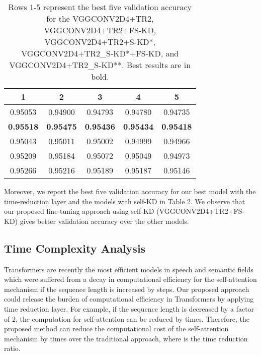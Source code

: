 \documentclass{article}
\begin{document}
\begin{table}[ht]
\caption{Rows 1-5 represent the best five validation accuracy for the VGGCONV2D4+TR2, VGGCONV2D4+TR2+FS-KD, VGGCONV2D4+TR2+S-KD*, VGGCONV2D4+TR2_S-KD*+FS-KD, and VGGCONV2D4+TR2_S-KD**. Best results are in bold.}
\label{val5}
\vskip 0.1in
\begin{center}
\begin{small}
\begin{sc}
\begin{tabular}{ccccc}
\toprule
    1&2&3&4&5 \\
\midrule
    0.95053& 0.94900& 0.94793& 0.94780& 0.94735 \\ 
    \textbf{0.95518}& \textbf{0.95475}& \textbf{0.95436}& \textbf{0.95434}& \textbf{0.95418} \\ 
    0.95043 & 0.95011& 0.95002& 0.94999& 0.94966 \\ 
    0.95209& 0.95184& 0.95072& 0.95049& 0.94973 \\ 
    0.95266& 0.95216& 0.95189& 0.95187& 0.95146 \\ 
\bottomrule
\end{tabular}
\end{sc}
\end{small}
\end{center}
\vskip -0.1in
\end{table}






Moreover, we  report the  best five  validation  accuracy for our best model with the time-reduction layer and the models with self-KD in Table 2. We observe that our proposed fine-tuning approach using self-KD (VGGCONV2D4+TR2+FS-KD) gives better validation accuracy over the other models. 

\subsection{Time Complexity Analysis}
Transformers are recently the most efficient models in speech and semantic fields which were suffered from a  decay in computational efficiency for the self-attention mechanism if the sequence length  is increased by  steps. Our proposed approach could release the burden of computational efficiency in Transformers by applying time reduction layer. For example, if the sequence length  is decreased by a factor of 2, the computation for self-attention can be reduced by  times. Therefore, the proposed method can reduce the computational cost of the self-attention mechanism by  times over the traditional approach, where  is the time reduction ratio. 
\end{document}
